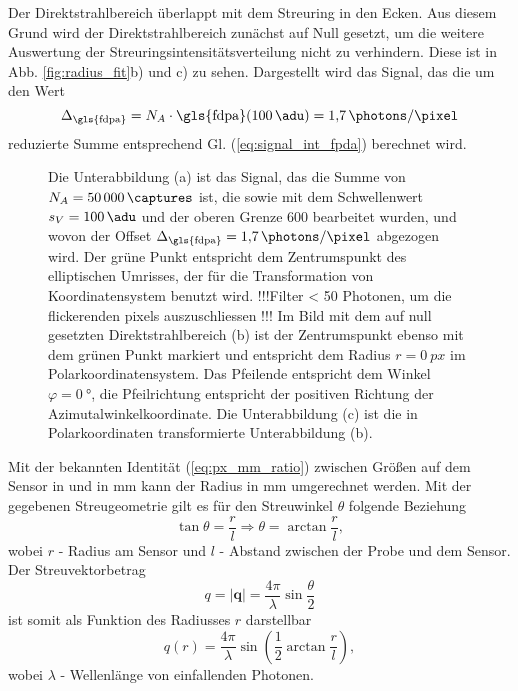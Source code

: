 \noindent
Der Direktstrahlbereich überlappt mit dem Streuring in den Ecken. Aus diesem Grund wird der Direktstrahlbereich zunächst auf Null gesetzt, um die weitere Auswertung der Streuringsintensitätsverteilung nicht zu verhindern. Diese ist in Abb. \ref{fig:radius_fit}b) und c) zu sehen. Dargestellt wird das Signal, das die um den Wert
\begin{equation}
    \Delta_\text{\gls{fdpa}} = N_A\cdot \text{\gls{fdpa}}(\SI{100}{\adu}) = \SI{1,7}{\photons\per\pixel}
\end{equation}
reduzierte Summe entsprechend Gl. (\ref{eq:signal_int_fpda}) berechnet wird.
\begin{figure}[H]
    \centering
    
    \caption{Die Unterabbildung (a) ist das Signal, das die Summe von $N_A = \SI{50000}{\captures}$ ist, die sowie mit dem Schwellenwert $s_V = \SI{100}{\adu}$ und der oberen Grenze \SI{600}{\adu} bearbeitet wurden, und wovon der Offset $\Delta_\text{\gls{fdpa}} = \SI{1,7}{\photons\per\pixel}$ abgezogen wird. Der grüne Punkt entspricht dem Zentrumspunkt des elliptischen Umrisses, der für die Transformation von Koordinatensystem benutzt wird. !!!Filter < 50 Photonen, um die flickerenden pixels auszuschliessen !!! Im Bild mit dem auf null gesetzten Direktstrahlbereich (b) ist der Zentrumspunkt ebenso mit dem grünen Punkt markiert und entspricht dem Radius $r=\SI{0}{px}$ im Polarkoordinatensystem. Das Pfeilende entspricht dem Winkel $\varphi = \SI{0}{\degree}$, die Pfeilrichtung entspricht der positiven Richtung der Azimutalwinkelkoordinate. Die Unterabbildung (c) ist die in Polarkoordinaten transformierte Unterabbildung (b).}
    \label{fig:th-100-200-maske-radial-transform}
\end{figure}
\noindent
Mit der bekannten Identität (\ref{eq:px_mm_ratio}) zwischen Größen auf dem Sensor in \si{\px} und in \si{\milli\meter} kann der Radius in \si{\milli\meter} umgerechnet werden. Mit der gegebenen Streugeometrie gilt es für den Streuwinkel $\theta$  folgende Beziehung
\begin{equation}
    \tan{\theta} = \frac{r}{l} \Rightarrow \theta = \arctan \frac{r}{l},
\end{equation}
wobei $r$ - Radius am Sensor und $l$ - Abstand zwischen der Probe und dem Sensor. Der Streuvektorbetrag 
\begin{equation}
    q = \left|\mathbf{q}\right| = \frac{4\pi}{\lambda}\sin{\frac{\theta}{2}}
\end{equation}
ist somit als Funktion des Radiusses $r$ darstellbar
\begin{equation}
    q(r) = \frac{4\pi}{\lambda}\sin\left(\frac{1}{2}\arctan\frac{r}{l}\right),
    \label{eq:streuvektor_von_radius}
\end{equation}
wobei $\lambda$ - Wellenlänge von einfallenden Photonen.

